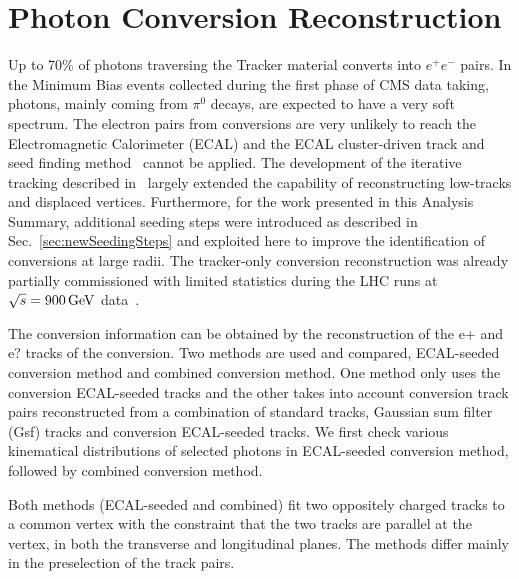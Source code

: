 \documentclass[a4paper]{jpconf}
\begin{document}
\section{Photon Conversion Reconstruction}
\label{standard}


Up to 70\% of photons traversing the Tracker material converts into  $e^+ e^-$ pairs.
In the Minimum Bias events collected during the  first phase of CMS data taking, photons, mainly coming from
$\pi^0$ decays, are expected to have a very soft spectrum. The electron pairs from conversions are very unlikely to
reach the Electromagnetic Calorimeter (ECAL) and the ECAL cluster-driven track and seed finding method~\cite{NOTE2006005, EGM-10-005}
cannot be applied. The development of the iterative tracking described in~\cite{TRK-10-001}
largely extended the capability of reconstructing low-\pt tracks and displaced vertices.
Furthermore, for the work presented in this Analysis Summary, additional seeding steps were introduced as described in Sec.~\ref{sec:newSeedingSteps}
and exploited here to improve the identification of conversions at large radii.
The tracker-only conversion reconstruction was already partially commissioned with limited statistics
during the LHC runs at $\sqrt{s}=900{\rm \, GeV}$ data~\cite{TRK-10-001}.


The conversion information can be obtained by the reconstruction of the e+ and e? tracks of the
	conversion. Two methods are used and compared, ECAL-seeded conversion method and combined conversion method. One method only uses the conversion ECAL-seeded tracks and the 	other takes into account conversion track pairs reconstructed from a combination of standard 	tracks, Gaussian sum filter (Gsf) tracks and conversion ECAL-seeded tracks. We first check various kinematical distributions of selected photons in ECAL-seeded conversion method, followed by combined conversion method.


Both methods (ECAL-seeded and combined) 	fit two oppositely charged tracks to a common vertex with the constraint that the two tracks 	are parallel at the vertex, in both the transverse and longitudinal planes. The methods differ 	mainly in the preselection of the track pairs.

\end{document}

